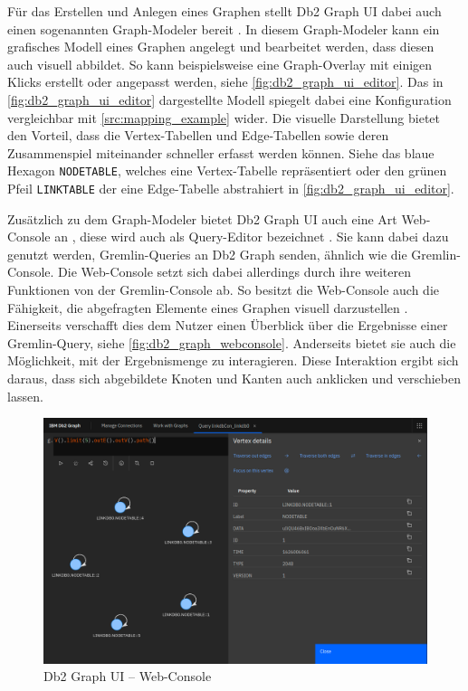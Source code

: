 Für das Erstellen und Anlegen eines Graphen stellt Db2 Graph UI dabei auch einen sogenannten Graph-Modeler bereit \cite{ibm_docs_db2_graph_ui}. In diesem Graph-Modeler kann ein grafisches Modell eines Graphen angelegt und bearbeitet werden, dass diesen auch visuell abbildet. So kann beispielsweise eine Graph-Overlay mit einigen Klicks erstellt oder angepasst werden, siehe \autoref{fig:db2_graph_ui_editor}. Das in \autoref{fig:db2_graph_ui_editor} dargestellte Modell spiegelt dabei eine Konfiguration vergleichbar mit \autoref{src:mapping_example} wider. Die visuelle Darstellung bietet den Vorteil, dass die Vertex-Tabellen und Edge-Tabellen sowie deren Zusammenspiel miteinander schneller erfasst werden können. Siehe das blaue Hexagon \texttt{NODETABLE}, welches eine Vertex-Tabelle repräsentiert oder den grünen Pfeil \texttt{LINKTABLE} der eine Edge-Tabelle abstrahiert in \autoref{fig:db2_graph_ui_editor}.

Zusätzlich zu dem Graph-Modeler bietet Db2 Graph UI auch eine Art Web-Console an \cite{ibm_docs_db2_graph_ui}, diese wird auch als Query-Editor bezeichnet \cite{ibm_docs_db2_graph_ui}. Sie kann dabei dazu genutzt werden, Gremlin-Queries an Db2 Graph senden, ähnlich wie die Gremlin-Console. Die Web-Console setzt sich dabei allerdings durch ihre weiteren Funktionen von der Gremlin-Console ab. So besitzt die Web-Console auch die Fähigkeit, die abgefragten Elemente eines Graphen visuell darzustellen \cite{ibm_docs_db2_graph_ui}. Einerseits verschafft dies dem Nutzer einen Überblick über die Ergebnisse einer Gremlin-Query, siehe \autoref{fig:db2_graph_webconsole}. Anderseits bietet sie auch die Möglichkeit, mit der Ergebnismenge zu interagieren. Diese Interaktion ergibt sich daraus, dass sich abgebildete Knoten und Kanten auch anklicken und verschieben lassen.

\begin{figure}[ht]
    \centering
    \includegraphics[width=\textwidth]{images/db2_graph_webconsole.png}
    \vspace{0.1em}
    \caption[Db2 Graph UI -- Web-Console]{Db2 Graph UI -- Web-Console}
    \label{fig:db2_graph_webconsole}
\end{figure}

